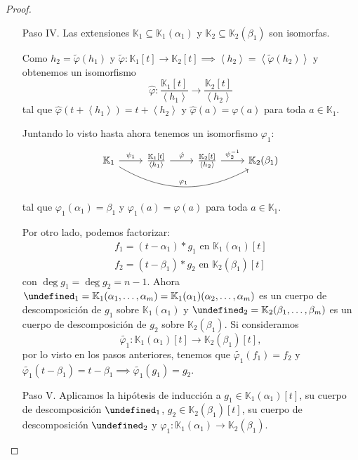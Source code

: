 \documentclass[10pt, spanish]{report}
\theoremstyle{definition}
\newcommand{\K}{\mathbb{K}}
\let\L\undefined
\newcommand{\L}{\mathbb{L}}
\begin{document}
\begin{proof}
\begin{itemize}[itemindent=30pt]
\begin{enumerate}[itemindent=24pt]
                \item[Paso IV.] Las extensiones $\K_1\subseteq\K_1(\alpha_1)$ y
                    $\K_2\subseteq\K_2(\beta_1)$ son isomorfas. 

                    Como $h_2=\tilde{\varphi}(h_1)$ y
                    $\tilde{\varphi}:\K_1[t]\to \K_2[t]\implies\left<h_2\right>
                    = \left< \tilde{\varphi}(h_2) \right> $ y obtenemos un
                    isomorfismo \[\hat{\varphi}:\frac{\K_1[t]}{\left<h_1\right>}
                    \to \frac{\K_2[t]}{\left<h_2\right>}\] tal que
                    $\hat{\varphi}(t+\left< h_1 \right> )=t+\left< h_2 \right>$
                    y $\hat{\varphi}(a)=\varphi(a)$ para toda $a\in\K_1$.  

                    Juntando lo visto hasta ahora tenemos un isomorfismo
                    $\varphi_1$:
                    \[\begin{tikzcd}
                        \K_1\ar{r}{\psi_1}\ar[bend right]{rrr}{\varphi_1}&
                    \frac{\K_1[t]}{\left<h_1\right>}\ar{r}{\hat{\varphi}}&
                    \frac{\K_2[t]}{\left<h_2\right>}\ar{r} {\psi_2^{-1}}&
                        \K_2(\beta_1)
                    \end{tikzcd}\]
                    tal que $\varphi_1(\alpha_1)=\beta_1$ y 
                    $\varphi_1(a)=\varphi(a)$ para toda $a\in\K_1$.

                    Por otro lado, podemos factorizar:
                    \begin{align*}
                        f_1=(t-\alpha_1)*g_1\text{ en }\K_1(\alpha_1)[t]\\
                        f_2=(t-\beta_1)*g_2\text{ en }\K_2(\beta_1)[t]
                    \end{align*}
                    con $\deg{g_1}=\deg{g_2}=n-1$. Ahora
                    $\L_1=\K_1(\alpha_1,\ldots,\alpha_m)=\K_1(\alpha_1)(\alpha_2,
                    \ldots,\alpha_m)$ es un cuerpo de descomposición de $g_1$
                    sobre $\K_1(\alpha_1)$ y $\L_2=\K_2(\beta_1,\ldots,\beta_m)$
                    es un cuerpo de descomposición de $g_2$ sobre
                    $\K_2(\beta_1)$. Si consideramos \[\tilde{\varphi_1}:
                    \K_1(\alpha_1)[t]\to\K_2(\beta_1)[t],\] por lo visto en los
                    pasos anteriores, tenemos que $\tilde{\varphi_1}(f_1)=f_2$ y
                    $\tilde{\varphi_1}(t-\beta_1)=t-\beta_1 \implies
                    \tilde{\varphi_1}(g_1)=g_2$. 
                \item[Paso V.] Aplicamos la hipótesis de inducción a
                    $g_1\in\K_1(\alpha_1)[t]$, su cuerpo de descomposición
                    $\L_1$, $g_2\in\K_2(\beta_1)[t]$, su cuerpo de
                    descomposición $\L_2$ y $\varphi_1:\K_1(\alpha_1)\to
                    \K_2(\beta_1)$.


\end{enumerate}
\end{itemize}
\end{proof}
\end{document}
